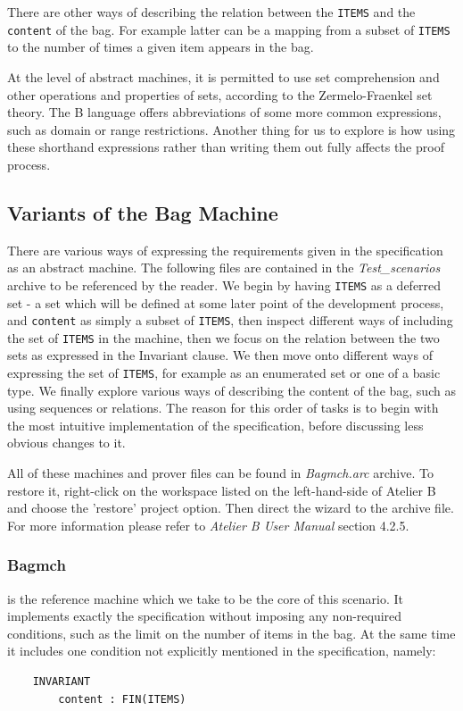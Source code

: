 \documentclass[12pt,journal,duplex]{IEEEtran}
\begin{document}
	There are other ways of describing the relation between the \texttt{ITEMS} and the \texttt{content} of the bag. For example latter can be a mapping from a subset of \texttt{ITEMS} to the number of times a given item appears in the bag.

	At the level of abstract machines, it is permitted to use set comprehension and other operations and properties of sets, according to the Zermelo-Fraenkel set theory. The B language offers abbreviations of some more common expressions, such as domain or range restrictions. Another thing for us to explore is how using these shorthand expressions rather than writing them out fully affects the proof process.

	\subsection{Variants of the Bag Machine}
	There are various ways of expressing the requirements given in the specification as an abstract machine. The following files are contained in the \emph{Test\_scenarios} archive to be referenced by the reader. We begin by having \texttt{ITEMS} as a deferred set - a set which will be defined at some later point of the development process, and \texttt{content} as simply a subset of \texttt{ITEMS}, then inspect different ways of including the set of \texttt{ITEMS} in the machine, then we focus on the relation between the two sets as expressed in the Invariant clause. We then move onto different ways of expressing the set of \texttt{ITEMS}, for example as an enumerated set or one of a basic type. We finally explore various ways of describing the content of the bag, such as using sequences or relations. The reason for this order of tasks is to begin with the most intuitive implementation of the specification, before discussing less obvious changes to it.


	All of these machines and prover files can be found in \emph{Bagmch.arc} archive. To restore it, right-click on the workspace listed on the left-hand-side of Atelier B and choose the 'restore' project option. Then direct the wizard to the archive file. For more information please refer to \emph{Atelier B User Manual} section 4.2.5.

	\subsubsection{Bagmch} is the reference machine which we take to be the core of this scenario. It implements exactly the specification without imposing any non-required conditions, such as the limit on the number of items in the bag. At the same time it includes one condition not explicitly mentioned in the specification, namely:
	\begin{lstlisting}
	INVARIANT
		content : FIN(ITEMS)
	\end{lstlisting}
\end{document}
